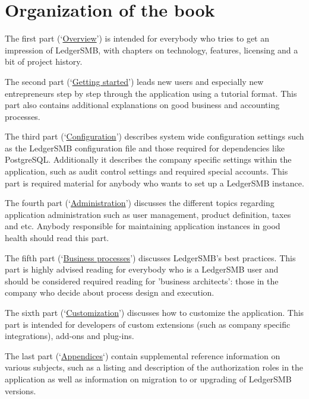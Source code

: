 \section*{Organization of the book}
\label{sec-book-organization}

The first
part (\lq\hyperref[part-overview]{Overview}\rq) is intended for everybody who tries to get an impression of LedgerSMB, with
chapters on technology, features, licensing and a bit of project history.

The second part
(\lq\hyperref[part-getting-started]{Getting started}\rq) leads new users and especially new entrepreneurs step by step through the
application using a tutorial format. This part also contains additional explanations on good business and accounting
processes.

The third part (\lq\hyperref[part-configuration]{Configuration}\rq) describes system wide configuration settings such as
the LedgerSMB configuration file and those required for dependencies like PostgreSQL. Additionally
it describes the company specific settings within the application, such as audit control settings
and required special accounts. This part is required material for anybody who wants to set up
a LedgerSMB instance.

The fourth part (\lq\hyperref[part-administration]{Administration}\rq) discusses the different topics
regarding application administration such as user management, product definition, taxes and etc.
Anybody responsible for maintaining application instances in good health should read this part.

The fifth part (\lq\hyperref[part-business-processes]{Business processes}\rq) discusses LedgerSMB's best practices. 
This part is highly advised
reading for everybody who is a LedgerSMB user and should be considered required reading for 'business
architects': those in the company who decide about process design and execution.

The sixth part (\lq\hyperref[part-customization]{Customization}\rq) discusses how to customize the application. 
This part is intended for developers of
custom extensions (such as company specific integrations), add-ons and plug-ins.

The last part (\lq\hyperref[part-appendices]{Appendices}\lq) contain supplemental reference information on various subjects, 
such as a listing and description
of the authorization roles in the application as well as information on migration to or upgrading of
LedgerSMB versions.


